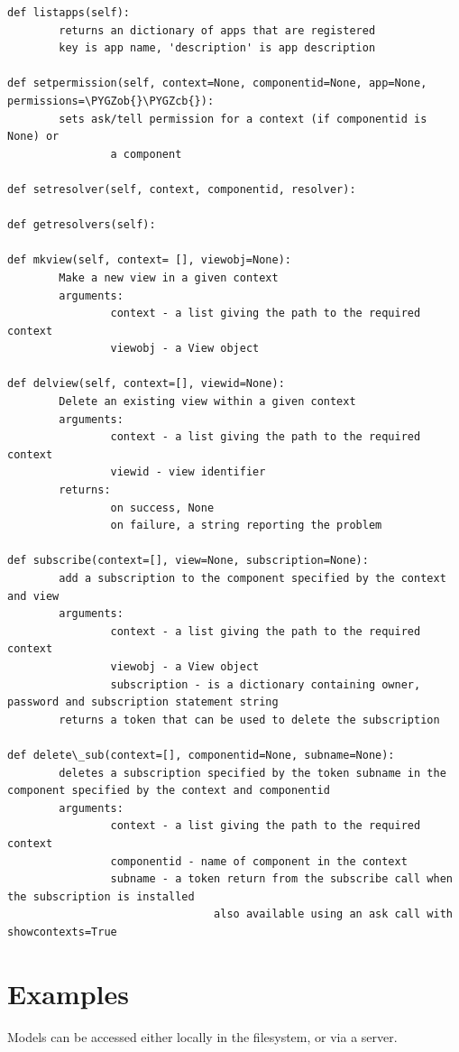 \documentclass[letterpaper,10pt,english]{sphinxmanual}
\def\PYGZob{\char`\{}
\def\PYGZcb{\char`\}}
\begin{document}
\begin{Verbatim}[commandchars=\\\{\}]
def listapps(self):
        returns an dictionary of apps that are registered
        key is app name, 'description' is app description

def setpermission(self, context=None, componentid=None, app=None, permissions=\PYGZob{}\PYGZcb{}):
        sets ask/tell permission for a context (if componentid is None) or
                a component

def setresolver(self, context, componentid, resolver):

def getresolvers(self):

def mkview(self, context= [], viewobj=None):
        Make a new view in a given context
        arguments:
                context - a list giving the path to the required context
                viewobj - a View object

def delview(self, context=[], viewid=None):
        Delete an existing view within a given context
        arguments:
                context - a list giving the path to the required context
                viewid - view identifier
        returns:
                on success, None
                on failure, a string reporting the problem

def subscribe(context=[], view=None, subscription=None):
        add a subscription to the component specified by the context and view
        arguments:
                context - a list giving the path to the required context
                viewobj - a View object
                subscription - is a dictionary containing owner, password and subscription statement string
        returns a token that can be used to delete the subscription

def delete\_sub(context=[], componentid=None, subname=None):
        deletes a subscription specified by the token subname in the component specified by the context and componentid
        arguments:
                context - a list giving the path to the required context
                componentid - name of component in the context
                subname - a token return from the subscribe call when the subscription is installed
                                also available using an ask call with showcontexts=True
\end{Verbatim}


\section{Examples}
\label{API:examples}
Models can be accessed either locally in the filesystem, or via a server.
\end{document}
